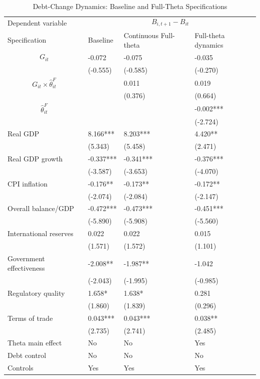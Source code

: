 \begin{table}[H]\centering
\begin{threeparttable}
\caption{Debt-Change Dynamics: Baseline and Full-Theta Specifications}
\label{tab:debt_change_combined_fulltheta}
\scriptsize
\begin{tabularx}{\textwidth}{lYYY}
\toprule
Dependent variable &  \\
\cmidrule(lr){2-4}
Specification & Baseline & Continuous Full-theta & Full-theta dynamics \\
\midrule
$$G_{it}$$ & -0.072 & -0.075 & -0.035 \\
 & (-0.555) & (-0.585) & (-0.270) \\
$$G_{it}\times\widehat{\theta}^{F}_{it}$$ &  & 0.011 & 0.019 \\
 &  & (0.376) & (0.664) \\
$$\widehat{\theta}^{F}_{it}$$ &  &  & -0.002*** \\
 &  &  & (-2.724) \\
Real GDP & 8.166*** & 8.203*** & 4.420** \\
 & (5.343) & (5.458) & (2.471) \\
Real GDP growth & -0.337*** & -0.341*** & -0.376*** \\
 & (-3.587) & (-3.653) & (-4.070) \\
CPI inflation & -0.176** & -0.173** & -0.172** \\
 & (-2.074) & (-2.084) & (-2.147) \\
Overall balance/GDP & -0.472*** & -0.473*** & -0.451*** \\
 & (-5.890) & (-5.908) & (-5.560) \\
International reserves & 0.022 & 0.022 & 0.015 \\
 & (1.571) & (1.572) & (1.101) \\
Government effectiveness & -2.008** & -1.987** & -1.042 \\
 & (-2.043) & (-1.995) & (-0.985) \\
Regulatory quality & 1.658* & 1.638* & 0.281 \\
 & (1.860) & (1.839) & (0.296) \\
Terms of trade & 0.043*** & 0.043*** & 0.038** \\
 & (2.735) & (2.741) & (2.485) \\
\midrule
Theta main effect & No & No & Yes \\
Debt control & No & No & No \\
Controls & Yes & Yes & Yes \\

\end{tabularx}
\end{threeparttable}
\end{table}
